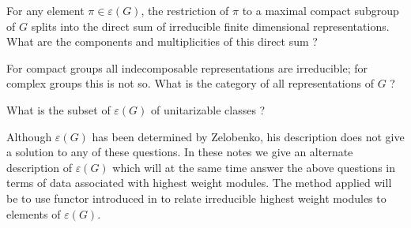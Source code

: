 \smallskip
{} For any element $\pi \in \varepsilon
(G)$,  the restriction of $\pi$ to a maximal compact subgroup of $G$
splits into the direct sum of irreducible finite dimensional
representations. What are the components and multiplicities of this
direct sum ?

\smallskip
{} For compact groups all indecomposable
representations are irreducible; for complex groups this is not
so. What is the category of all representations of $G$ ?

\smallskip
{} What is the subset of $\varepsilon
(G)$ of unitarizable classes ?


Although $\varepsilon (G)$ has been determined by Zelobenko, his
description does not give a solution to any of these questions. In
these notes we give an alternate description of $\varepsilon (G)$
which will at the same time answer the above questions in terms of
data associated with highest weight modules. The method applied will
be to use functor introduced in \cite{key15} to relate irreducible
highest weight modules to elements of $\varepsilon (G)$.

